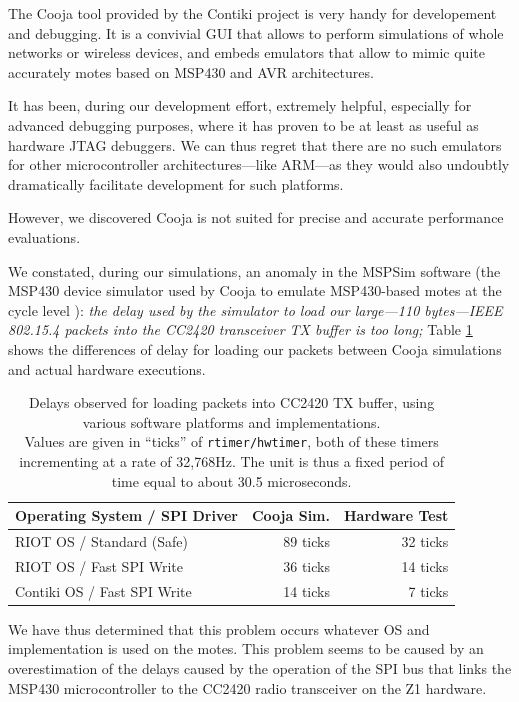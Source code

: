 \documentclass[12pt,a4paper]{article}
\begin{document}
The Cooja tool provided by the Contiki project \cite{Cooja} is very handy for
developement and debugging. It is a convivial GUI that allows to perform
simulations of whole networks or wireless devices, and embeds emulators
that allow to mimic quite accurately motes based on MSP430 and AVR
architectures.

It has been, during our development effort, extremely helpful, especially for
advanced debugging purposes, where it has proven to be at least as useful as
hardware JTAG debuggers. We can thus regret that there are no such emulators
for other microcontroller architectures---like ARM---as they would also
undoubtly dramatically facilitate development for such platforms.

\begin{observ}
However, we discovered Cooja is not suited for precise and accurate
performance evaluations.
\end{observ}

We constated, during our simulations, an anomaly in the MSPSim software
(the MSP430 device simulator used by Cooja to emulate MSP430-based motes
at the cycle level \cite{MSPSim}): \emph{the delay used by the simulator
to load our large---110 bytes---IEEE 802.15.4 packets into the CC2420
transceiver TX buffer is too long;} Table \ref{TblTXPktLoadDelays} shows
the differences of delay for loading our packets between Cooja simulations
and actual hardware executions.

\begin{table}[!h]
\centering
\begin{tabular}{|l|r|r|}
\hline
Operating System / SPI Driver &  Cooja Sim.  & Hardware Test \\
\hline
RIOT OS / Standard (Safe)     &   89 ticks   &  32 ticks \\ 
RIOT OS / Fast SPI Write      &   36 ticks   &  14 ticks \\
Contiki OS / Fast SPI Write   &   14 ticks   &   7 ticks \\
\hline
\end{tabular}
\caption{Delays observed for loading packets into CC2420 TX buffer,
using various software platforms and implementations.\\
Values are given in ``ticks'' of \texttt{rtimer/hwtimer}, both of these
timers incrementing at a rate of 32,768Hz. The unit is thus a fixed period
of time equal to about 30.5 microseconds.}
\label{TblTXPktLoadDelays}
\end{table}

We have thus determined that this problem occurs whatever OS and
implementation is used on the motes. This problem seems to be caused
by an overestimation of the delays caused by the operation of the SPI bus
that links the MSP430 microcontroller to the CC2420 radio transceiver
on the Z1 hardware.
\end{document}
